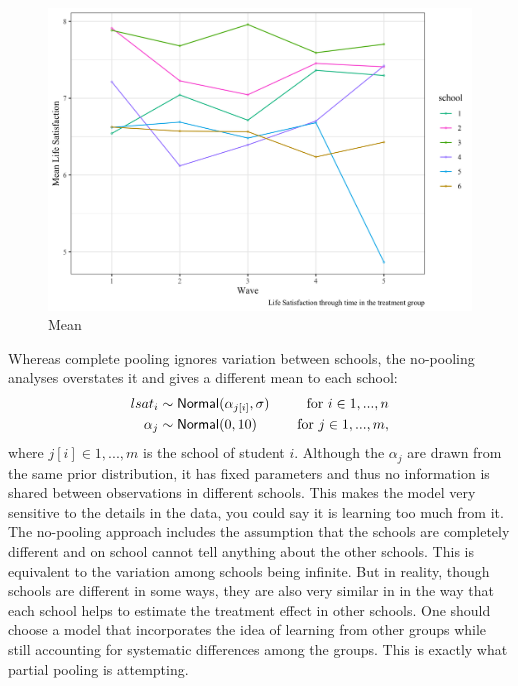\documentclass[a4, 12pt]{article}
\begin{document}
\begin{figure}

{\centering \includegraphics[width=0.8\linewidth]{../figures/lsat_vs_time_by_school_treated} 

}

\caption{Mean}\label{fig:lsat-vs-time}
\end{figure}

Whereas complete pooling ignores variation between schools, the no-pooling analyses overstates it and gives a different mean to each school:
\begin{align*}
lsat_i & \sim {\sf Normal} (\alpha_{j[i]}, \sigma) & \quad \text{for } i \in 1,...,n \\
\alpha_{j} & \sim {\sf Normal} (0, 10) & \quad \text{for } j \in 1,...,m,
\end{align*}
where \(j[i] \in 1,...,m\) is the school of student \(i\).
Although the \(\alpha_j\) are drawn from the same prior distribution, it has fixed parameters and thus no information is shared between observations in different schools. This makes the model very sensitive to the details in the data, you could say it is learning too much from it. The no-pooling approach includes the assumption that the schools are completely different and on school cannot tell anything about the other schools. This is equivalent to the variation among schools being infinite. But in reality, though schools are different in some ways, they are also very similar in in the way that each school helps to estimate the treatment effect in other schools. One should choose a model that incorporates the idea of learning from other groups while still accounting for systematic differences among the groups. This is exactly what partial pooling is attempting.
\end{document}
